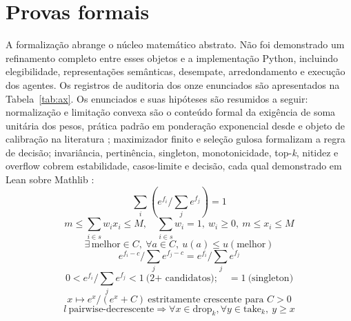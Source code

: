 \documentclass[12pt,openany,oneside,a4paper,brazil,chapter=TITLE]{abntex2}
\let\cite\citep
\begin{document}


\chapter{Provas formais}\label{cap:provas}
A formalização abrange o núcleo matemático abstrato. Não foi demonstrado um refinamento completo entre esses objetos e a implementação Python, incluindo elegibilidade, representações semânticas, desempate, arredondamento e execução dos agentes. Os registros de auditoria dos onze enunciados são apresentados na Tabela~\ref{tab:ax}.
Os enunciados e suas hipóteses são resumidos a seguir: normalização e limitação convexa são o conteúdo formal da exigência de soma unitária dos pesos, prática padrão em ponderação exponencial desde \cite{vaswani2017} e objeto de calibração na literatura \cite{komisarenko2024,xuan2025}; maximizador finito e seleção gulosa formalizam a regra de decisão; invariância, pertinência, singleton, monotonicidade, top-\textit{k}, nitidez e overflow cobrem estabilidade, casos-limite e decisão, cada qual demonstrado em Lean sobre Mathlib \cite{moura2021,mathlib2020}:
\begin{equation*}
\sum_i\left(e^{f_i}/\sum_j e^{f_j}\right)=1 \tag{T1}
\end{equation*}
\begin{equation*}
m\leq\sum_{i\in s}w_ix_i\leq M,\quad \sum_{i\in s}w_i=1,\ w_i\geq0,\ m\leq x_i\leq M \tag{T2/T6}
\end{equation*}
\begin{equation*}
\exists\,\text{melhor}\in C,\ \forall a\in C,\ u(a)\leq u(\text{melhor}) \tag{T3}
\end{equation*}
\begin{equation*}
e^{f_i-c}/\sum_j e^{f_j-c}=e^{f_i}/\sum_j e^{f_j} \tag{T4}
\end{equation*}
\begin{equation*}
0<e^{f_i}/\sum_j e^{f_j}<1\ \text{(2+ candidatos)};\quad =1\ \text{(singleton)} \tag{T5/T7}
\end{equation*}
\begin{equation*}
x\mapsto e^x/(e^x+C)\ \text{estritamente crescente para }C>0 \tag{T8}
\end{equation*}
\begin{equation*}
l\ \text{pairwise-decrescente}\Rightarrow\forall x\in\text{drop}_k,\forall y\in\text{take}_k,\ y\geq x \tag{T9}
\end{equation*}
\end{document}
